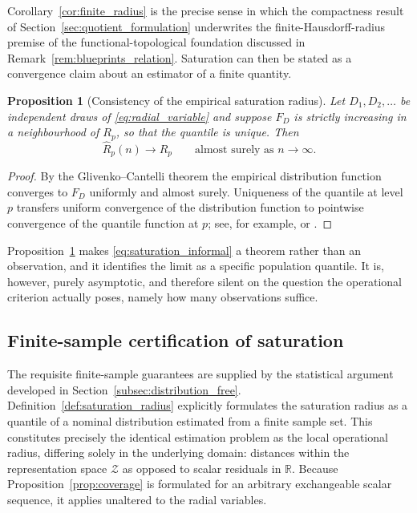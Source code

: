\documentclass[a4paper]{cas-sc}
\newtheorem{proposition}{Proposition}
\newcommand{\Z}{\ensuremath{\mathcal{Z}}}
\newcommand{\R}{\ensuremath{\mathbb{R}}}
\begin{document}
Corollary~\ref{cor:finite_radius} is the precise sense in which the compactness
result of Section~\ref{sec:quotient_formulation} underwrites the
finite-Hausdorff-radius premise of the functional-topological foundation
discussed in Remark~\ref{rem:blueprints_relation}. Saturation can then be
stated as a convergence claim about an estimator of a finite quantity.

\begin{proposition}[Consistency of the empirical saturation radius]
\label{prop:radius_consistency}
Let \(D_1,D_2,\ldots\) be independent draws of \eqref{eq:radial_variable} and
suppose \(F_D\) is strictly increasing in a neighbourhood of \(R_p\), so that
the quantile is unique. Then
\begin{equation}
\widehat R_p(n) \longrightarrow R_p \qquad \text{almost surely as } n\to\infty .
\label{eq:radius_consistency}
\end{equation}
\end{proposition}

\begin{proof}
By the Glivenko--Cantelli theorem the empirical distribution function
converges to \(F_D\) uniformly and almost surely. Uniqueness of the quantile at
level \(p\) transfers uniform convergence of the distribution function to
pointwise convergence of the quantile function at \(p\); see, for example,
\citet[Sec.~2.3]{serfling1980} or \citet[Lemma~21.2]{vandervaart1998}.
\end{proof}

Proposition~\ref{prop:radius_consistency} makes
\eqref{eq:saturation_informal} a theorem rather than an observation, and it
identifies the limit as a specific population quantile. It is, however, purely
asymptotic, and therefore silent on the question the operational criterion
actually poses, namely how many observations suffice.

\subsection{Finite-sample certification of saturation}
\label{subsec:saturation_certification}

The requisite finite-sample guarantees are supplied by the statistical argument developed in Section~\ref{subsec:distribution_free}. Definition~\ref{def:saturation_radius} explicitly formulates the saturation radius as a quantile of a nominal distribution estimated from a finite sample set. This constitutes precisely the identical estimation problem as the local operational radius, differing solely in the underlying domain: distances within the representation space \(\Z\) as opposed to scalar residuals in \(\R\). Because Proposition~\ref{prop:coverage} is formulated for an arbitrary exchangeable scalar sequence, it applies unaltered to the radial variables.
\end{document}
